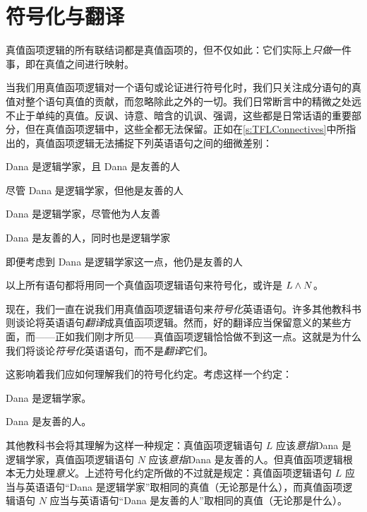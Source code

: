 \section{符号化与翻译}
真值函项逻辑的所有联结词都是真值函项的，但不仅如此：它们实际上\emph{只做}一件事，即在真值之间进行映射。

当我们用真值函项逻辑对一个语句或论证进行符号化时，我们只关注成分语句的真值对整个语句真值的贡献，而忽略除此之外的一切。我们日常断言中的精微之处远不止于单纯的真值。反讽、诗意、暗含的讥讽、强调，这些都是日常话语的重要部分，但在真值函项逻辑中，这些全都无法保留。正如在\cref{s:TFLConnectives}中所指出的，真值函项逻辑无法捕捉下列英语语句之间的细微差别：


\begin{compactlist}
		\item Dana 是逻辑学家，且 Dana 是友善的人
		\item 尽管 Dana 是逻辑学家，但他是友善的人
		\item Dana 是逻辑学家，尽管他为人友善
		\item Dana 是友善的人，同时也是逻辑学家
		\item 即便考虑到 Dana 是逻辑学家这一点，他仍是友善的人
	\end{compactlist}


以上所有语句都将用同一个真值函项逻辑语句来符号化，或许是 $L \wedge N$。

现在，我们一直在说我们用真值函项逻辑语句来\emph{符号化}英语语句。许多其他教科书则谈论将英语语句\emph{翻译}成真值函项逻辑。然而，好的翻译应当保留意义的某些方面，而——正如我们刚才所见——真值函项逻辑恰恰做不到这一点。这就是为什么我们将谈论\emph{符号化}英语语句，而不是\emph{翻译}它们。

这影响着我们应如何理解我们的符号化约定。考虑这样一个约定：


\begin{ekey}
		\item[L] Dana 是逻辑学家。
		\item[N] Dana 是友善的人。
	\end{ekey}


其他教科书会将其理解为这样一种规定：真值函项逻辑语句 $L$ 应该\emph{意指}Dana 是逻辑学家，真值函项逻辑语句 $N$ 应该\emph{意指}Dana 是友善的人。但真值函项逻辑根本无力处理\emph{意义}。上述符号化约定所做的不过就是规定：真值函项逻辑语句 $L$ 应当与英语语句“Dana 是逻辑学家”取相同的真值（无论那是什么），而真值函项逻辑语句 $N$ 应当与英语语句“Dana 是友善的人”取相同的真值（无论那是什么）。

